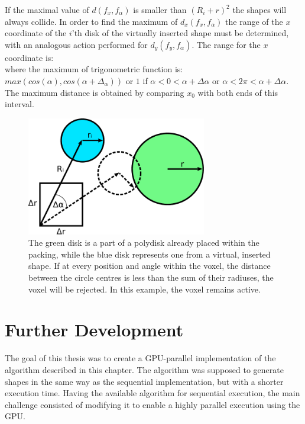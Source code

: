\documentclass[12pt, oneside]{report}
\begin{document}
If the maximal value of $d(f_x,f_{\alpha})$ is smaller than $(R_i + r)^2$ the shapes will always collide. \newline
In order to find the maximum of $d_x(f_x,f_{\alpha})$ the range of the $x$ coordinate of the $i$'th disk of the virtually inserted shape must be determined, with an analogous action performed for $d_y(f_y,f_{\alpha})$. The range for the $x$ coordinate is:
\begin{equation*}
[x + R_i \cdot \min_{f_{\alpha} \in [0,1)} cos(\alpha_i + f_{\alpha} \cdot \Delta \alpha), x + \Delta r + R_i \cdot \max_{f_{\alpha} \in [0,1)} cos(\alpha_i + f_{\alpha} \cdot \Delta \alpha)]
\end{equation*}
where the maximum of trigonometric function is: $max (cos(\alpha), cos(\alpha + \Delta_{\alpha})) $ or
$1$ if $ \alpha<0<\alpha + \Delta \alpha $ or $ \alpha< 2 \pi <\alpha + \Delta \alpha$.
The maximum distance is obtained by comparing $x_0$ with both ends of this interval. \newline


\begin{figure}[H]
  \centering
	\includegraphics[width=0.7\textwidth,keepaspectratio]{Images/CieslaAlgorithm/drawing.pdf}
	\caption{The green disk is a part of a polydisk already placed within the packing, while the blue disk represents one from a virtual, inserted shape. If at every position and angle within the voxel, the distance between the circle centres is less than the sum of their radiuses, the voxel will be rejected. In this example, the voxel remains active.}
	\label{CieslaAlgorithmDemo}
\end{figure}

\section{Further Development}

The goal of this thesis was to create a GPU-parallel implementation of the algorithm described in this chapter. The algorithm was supposed to generate shapes in the same way as the sequential implementation, but with a shorter execution time. \newline
Having the available algorithm for sequential execution, the main challenge consisted of modifying it to enable a highly parallel execution using the GPU.
\end{document}
